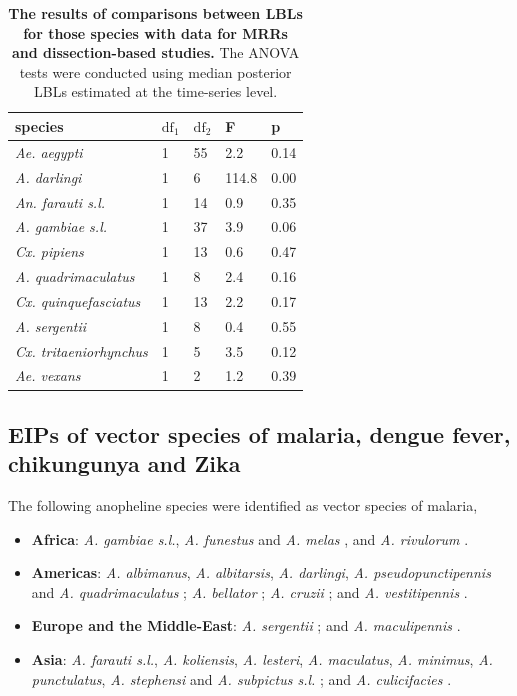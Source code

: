 \documentclass[12pt]{article}
\begin{document}
{\begin{table}[htbp]
	\centering
	\begin{tabular}{l|l|l|l|l}
		species & \multicolumn{1}{l}{$\text{df}_1$} & \multicolumn{1}{l}{$\text{df}_2$} & \multicolumn{1}{l}{F} & \multicolumn{1}{l}{p} \\
		\midrule
		\textit{Ae. aegypti} & 1     & 55    & 2.2   & 0.14 \\
		\textit{A. darlingi} & 1     & 6     & 114.8   & 0.00 \\
		\textit{An. farauti s.l.} & 1     & 14    & 0.9  & 0.35 \\
		\textit{A. gambiae s.l.} & 1     & 37    & 3.9   & 0.06 \\
		\textit{Cx. pipiens} & 1     & 13    & 0.6   & 0.47 \\
		\textit{A. quadrimaculatus} & 1     & 8     & 2.4     & 0.16 \\
		\textit{Cx. quinquefasciatus} & 1     & 13    & 2.2    & 0.17 \\
		\textit{A. sergentii} & 1     & 8     & 0.4     & 0.55 \\
		\textit{Cx. tritaeniorhynchus} & 1     & 5     & 3.5   & 0.12 \\
		\textit{Ae. vexans} & 1     & 2     & 1.2   & 0.39 \\
	\end{tabular}%
	\caption{\textbf{The results of comparisons between LBLs for those species with data for MRRs and dissection-based studies.} The ANOVA tests were conducted using median posterior LBLs estimated at the time-series level.}
	\label{tab:comparison}%
\end{table}%

\subsection{EIPs of vector species of malaria, dengue fever, chikungunya and Zika}
The following anopheline species were identified as vector species of malaria,

\begin{itemize}
	\item \textbf{Africa}: \textit{A. gambiae s.l.}, \textit{A. funestus} and \textit{A. melas} \citep{sinka2012global}, and \textit{A. rivulorum} \citep{wilkes1996anopheles}.
	\item \textbf{Americas}: \textit{A. albimanus}, \textit{A. albitarsis}, \textit{A. darlingi}, \textit{A. pseudopunctipennis} and \textit{A. quadrimaculatus} \citep{sinka2012global}; \textit{A. bellator}  \citep{forattini1999role,lorenz2012morphometrical}; \textit{A. cruzii} \citep{lorenz2012morphometrical}; and \textit{A. vestitipennis} \citep{sinka2010dominant}.
	\item \textbf{Europe and the Middle-East}: \textit{A. sergentii} \citep{sinka2012global}; and \textit{A. maculipennis} \citep{hackett1935varieties}.
	\item \textbf{Asia}: \textit{A. farauti s.l.}, \textit{A. koliensis}, \textit{A. lesteri}, \textit{A. maculatus}, \textit{A. minimus}, \textit{A. punctulatus}, \textit{A. stephensi} and \textit{A. subpictus s.l.} \citep{sinka2012global}; and \textit{A. culicifacies} \citep{green1980chromosomal}.
\end{itemize}

}
\end{document}
